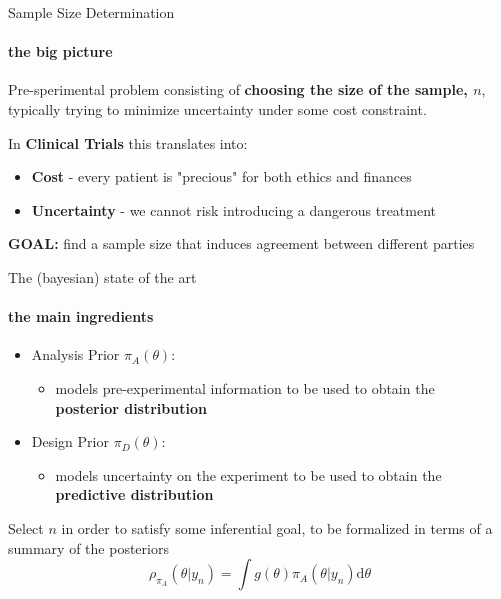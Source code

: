 \documentclass[9 pt]{beamer}
\begin{document}
\begin{frame}{Sample Size Determination}
\framesubtitle{the big picture}

Pre-sperimental problem consisting of \textbf{choosing the
size of the sample, $n$}, typically trying to minimize uncertainty under some cost constraint. 

\pause
\vspace{0.75cm}

In \textcolor{light}{\bf Clinical Trials} this translates into:

\begin{itemize}
\tightlist
\item \textbf{Cost} - every patient is "precious" for both ethics and finances
\item \textbf{Uncertainty} - we cannot risk introducing a dangerous treatment
\end{itemize}


\pause
\begin{exampleblock}

\textbf{GOAL:} find a sample size that induces agreement between different parties

\end{exampleblock}

\end{frame}


\begin{frame}{The (bayesian) state of the art}
\framesubtitle{the main ingredients}


\begin{itemize}
    \item Analysis Prior $\pi_A(\theta)$:
    \begin{itemize}
        \item \textcolor{light}{models pre-experimental information to be used to obtain the\\ {\bf posterior distribution}}
    \end{itemize}
    \vspace{0.25cm}

    \item Design Prior $\pi_D(\theta)$:
    \begin{itemize}
        \item \textcolor{light}{models uncertainty on the experiment to be used to obtain the\\ {\bf predictive distribution}}
    \end{itemize}
\end{itemize}

\pause
\vspace{0.5cm}

\begin{exampleblock}

Select $n$ in order to satisfy some inferential goal, to be formalized in terms of a summary of the posteriors
\[\rho_{\pi_A}(\theta|y_n) = \int{ g(\theta)\pi_A(\theta|y_n)\text{d}\theta } \]

\end{exampleblock}

\end{frame}
\end{document}
